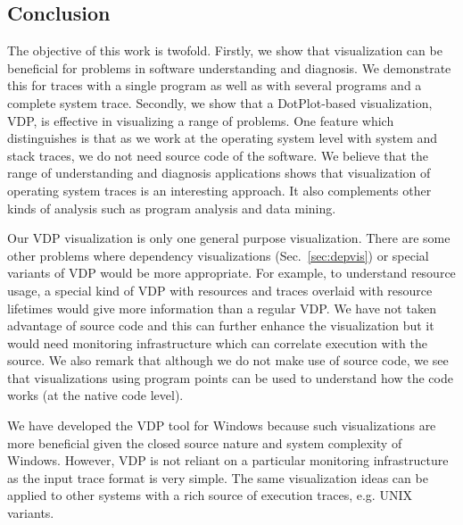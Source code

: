 \subsection{Conclusion}
\label{sec:lviz-conclusion}

The objective of this work is twofold.
Firstly, we show that visualization can be beneficial for problems
in software understanding and diagnosis. We demonstrate this
for traces with a single program as well as with
several programs and a complete system trace.
Secondly, we show that a DotPlot-based visualization, VDP, is effective
in visualizing a range of problems.
One feature which distinguishes  is that as we work
at the operating system level with system and stack traces,
we do not need source code of the software.
We believe that the range of understanding and diagnosis applications
shows that visualization of operating system traces is an interesting approach.
It also complements other kinds of analysis such
as program analysis and data mining.

Our VDP visualization is only one general purpose visualization.
There are some other problems where dependency visualizations
(Sec.~\ref{sec:depvis}) or special
variants of VDP would be more appropriate. For example, to understand
resource usage, a special kind of VDP with resources and traces overlaid
with resource lifetimes would give more information than a regular VDP.
We have not taken advantage of source code and this can further enhance
the visualization but it would need monitoring infrastructure which
can correlate execution with the source.
We also remark that although we do not make use of source code, we
see that visualizations using program points can be used to understand
how the code works (at the native code level).

We have developed the VDP tool for Windows because such visualizations
are more beneficial given the closed source nature and system complexity
of Windows.
However, VDP is not reliant on a particular monitoring infrastructure
as the input trace format is very simple.
The same visualization ideas can be applied
to other systems with a rich source of execution traces, e.g. UNIX variants.
